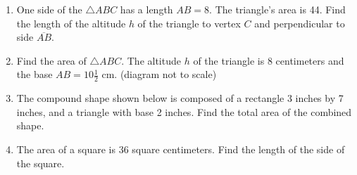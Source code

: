 \begin{enumerate}
\item One side of the $\triangle ABC$ has a length $AB=8$. The triangle's area is 44. Find the length of the altitude $h$ of the triangle to vertex $C$ and perpendicular to side $\overline{AB}$.\\[0.5cm]


\item Find the area of $\triangle ABC$. The altitude $h$ of the triangle is $8$ centimeters and the base $AB=10 \frac{1}{2}$ cm. (diagram not to scale) \\[0.5cm]

\item The compound shape shown below is composed of a rectangle 3 inches by 7 inches, and a triangle with base 2 inches. Find the total area of the combined shape.
    \vspace{0.5cm} 
    \begin{flushleft}
    \end{flushleft}
        
\item The area of a square is 36 square centimeters. Find the length of the side of the square. \vspace{3cm}


\end{enumerate}
